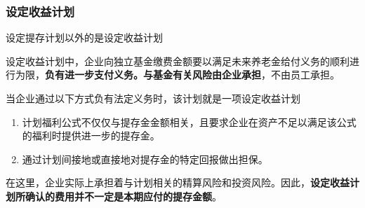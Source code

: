 \documentclass[UTF8,12pt]{ctexart}
\numberwithin{equation}{section} %
\numberwithin{figure}{section}
\numberwithin{table}{section}
\begin{document}
	\subsubsection{设定收益计划}
	设定提存计划以外的是设定收益计划
	
	设定收益计划中，企业向独立基金缴费金额要以满足未来养老金给付义务的顺利进行为限，\textbf{负有进一步支付义务。与基金有关风险由企业承担}，不由员工承担。
	
	当企业通过以下方式负有法定义务时，该计划就是一项设定收益计划
	\begin{enumerate}
		\item 计划福利公式不仅仅与提存金金额相关，且要求企业在资产不足以满足该公式的福利时提供进一步的提存金。
		
		\item 通过计划间接地或直接地对提存金的特定回报做出担保。
	\end{enumerate}

	在这里，企业实际上承担着与计划相关的精算风险和投资风险。因此，\textbf{设定收益计划所确认的费用并不一定是本期应付的提存金额}。
	
\end{document}
